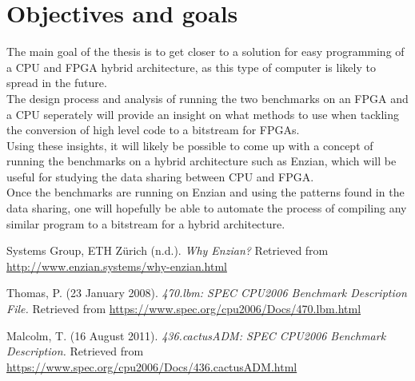 \documentclass[12pt]{article}
\begin{document}
\section*{Objectives and goals}
The main goal of the thesis is to get closer to a solution for easy programming of a CPU and FPGA hybrid architecture, as this type of computer is likely to spread in the future.\\
The design process and analysis of running the two benchmarks on an FPGA and a CPU seperately will provide an insight on what methods to use when tackling the conversion of high level code to a bitstream for FPGAs.\\
Using these insights, it will likely be possible to come up with a concept of running the benchmarks on a hybrid architecture such as Enzian, which will be useful for studying the data sharing between CPU and FPGA.\\
Once the benchmarks are running on Enzian and using the patterns found in the data sharing, one will hopefully be able to automate the process of compiling any similar program to a bitstream for a hybrid architecture.

\begin{thebibliography}{3}
Systems Group, ETH Z{\"u}rich (n.d.). \textit{Why Enzian?}
Retrieved from \url{http://www.enzian.systems/why-enzian.html}

Thomas, P. (23 January 2008). \textit{470.lbm: SPEC CPU2006 Benchmark Description File.}
Retrieved from \url{https://www.spec.org/cpu2006/Docs/470.lbm.html}

Malcolm, T. (16 August 2011). \textit{436.cactusADM: SPEC CPU2006 Benchmark Description.}
Retrieved from \url{https://www.spec.org/cpu2006/Docs/436.cactusADM.html}

\end{thebibliography}

\newpage
\end{document}
